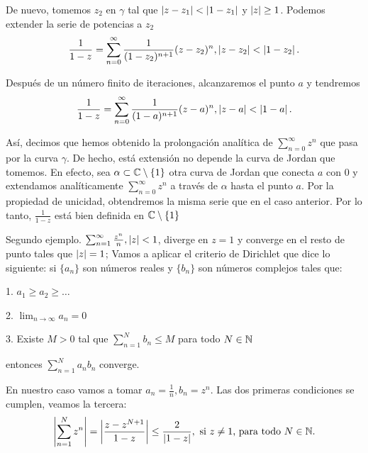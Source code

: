 De nuevo, tomemos $z_2$ en $\gamma$ tal que $\left\lvert z - z_1\right\rvert < \left\lvert1 - z_1\right\rvert$ y $\left\lvert z\right\rvert \geq 1$. Podemos extender la serie de potencias a $z_2$
\begin{equation*}
    \frac{1}{1-z} = \sum_{n=0}^{\infty} \frac{1}{(1 - z_2)^{n+1}} (z - z_2)^n , \left\lvert z - z_2\right\rvert < \left\lvert1 - z_2\right\rvert.
\end{equation*}


Después de un número finito de iteraciones, alcanzaremos el punto $a$ y tendremos
\begin{equation*}
    \frac{1}{1-z} = \sum_{n=0}^{\infty} \frac{1}{(1 - a)^{n+1}} (z - a)^n , \left\lvert z - a\right\rvert < \left\lvert1 - a\right\rvert.
\end{equation*}

Así, decimos que hemos obtenido la prolongación analítica de $\sum_{n=0}^{\infty} z^n$ que pasa por la curva $\gamma$. De hecho, está extensión no depende la curva de Jordan que tomemos. En efecto, sea $\alpha \subset \mathbb{C} \setminus \{1\}$ otra curva de Jordan que conecta $a$ con $0$ y extendamos analíticamente $\sum_{n=0}^{\infty} z^n$ a través de $\alpha$ hasta el punto $a$. Por la propiedad de unicidad, obtendremos la misma serie que en el caso anterior. Por lo tanto, $\frac{1}{1 - z}$ está bien definida en $\mathbb{C} \setminus \{1\}$ \\ \par


Segundo ejemplo. $\sum_{n=1}^{\infty} \frac{z^n}{n}, \left\lvert z\right\rvert < 1$, diverge en $z = 1$  y converge en el resto de punto tales que $\left\lvert z\right\rvert = 1$;
Vamos a aplicar el criterio de Dirichlet que dice lo siguiente: si $\{a_n\}$ son números reales y $\{b_n\}$ son números complejos tales que:

1. $a_1 \geq a_2 \geq \dots$

2. $\lim_{n \rightarrow \infty} a_n = 0$

3. Existe $M > 0$ tal que $\sum_{n=1}^{N} b_n \leq M$ para todo $N \in \mathbb{N}$

entonces $\sum_{n=1}^{N} a_nb_n$ converge.

En nuestro caso vamos a tomar $a_n = \frac{1}{n}, b_n = z^n$. Las dos primeras condiciones se cumplen, veamos la tercera:
\begin{equation*}
\left\lvert\sum_{n=1}^{N} z^n\right\rvert = \left\lvert\frac{z - z^{N+1}}{1 - z}\right\rvert \leq \frac{2}{\left\lvert1 - z\right\rvert}, \text{ si } z \neq 1 \text{, para todo } N \in \mathbb{N}.
\end{equation*}

